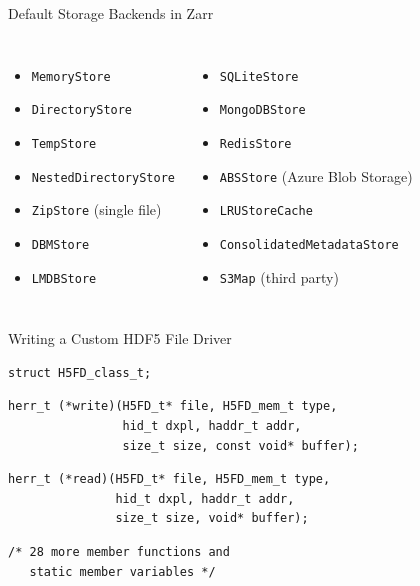 \documentclass{beamer}
\begin{document}
\begin{frame}{Default Storage Backends in Zarr}
  \begin{columns}
    \begin{itemize}
    \item \texttt{MemoryStore}
    \item \texttt{DirectoryStore}
    \item \texttt{TempStore}
    \item \texttt{NestedDirectoryStore}
    \item \texttt{ZipStore} (single file)
    \item \texttt{DBMStore}
    \item \texttt{LMDBStore}
    \end{itemize}

    \begin{itemize}
    \item \texttt{SQLiteStore}
    \item \texttt{MongoDBStore}
    \item \texttt{RedisStore}
    \item \texttt{ABSStore} (Azure Blob Storage)
    \item \texttt{LRUStoreCache}
    \item \texttt{ConsolidatedMetadataStore}
    \item \texttt{S3Map} (third party)
    \end{itemize}
  \end{columns}
\end{frame}

\begin{frame}[fragile]{Writing a Custom HDF5 File Driver}
  \begin{verbatim}
struct H5FD_class_t;
  \end{verbatim}
  \pause
  
  \begin{verbatim}
herr_t (*write)(H5FD_t* file, H5FD_mem_t type,
                hid_t dxpl, haddr_t addr,
                size_t size, const void* buffer);
  \end{verbatim}
  \pause

  \begin{verbatim}
herr_t (*read)(H5FD_t* file, H5FD_mem_t type,
               hid_t dxpl, haddr_t addr,
               size_t size, void* buffer);
  \end{verbatim}
  \pause

  \begin{verbatim}
/* 28 more member functions and
   static member variables */
  \end{verbatim}

\end{frame}
\end{document}
